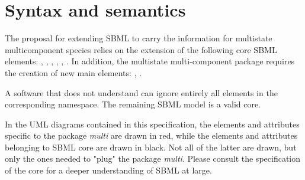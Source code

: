\chapter {Syntax and semantics}

The proposal for extending SBML to carry the information for multistate multicomponent species relies on the extension of the following core SBML elements: , , , , , . In addition, the multistate multi-component package requires the creation of new main elements: , . 

A software that does not understand \multiVone can ignore entirely all elements in the corresponding namespace. The remaining SBML model is a valid \sbmlLthreeVone core.

In the UML diagrams contained in this specification, the elements and attributes specific to the package \emph{multi} are drawn in red, while the elements and attributes belonging to SBML core are drawn in black. Not all of the latter are drawn, but only the ones needed to "plug" the package \emph{multi}. Please consult the specification of the core for a deeper understanding of SBML at large.
 







